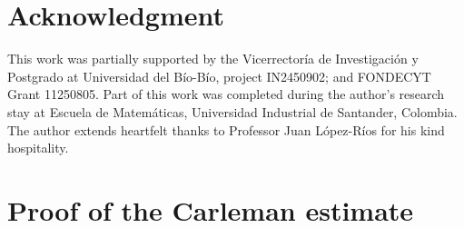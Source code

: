 \documentclass[11pt,oneside,leqno]{amsart}
\numberwithin{equation}{section}
\numberwithin{equation}{section}
\begin{document}
\section*{Acknowledgment}
This work was partially supported by the Vicerrector\'ia de Investigaci\'on y Postgrado at Universidad del B\'io-B\'io, project IN2450902; and FONDECYT Grant 11250805. Part of this work was completed during the author's research stay at Escuela de Matem\'aticas, Universidad Industrial de Santander, Colombia. The author extends heartfelt thanks to Professor Juan L\'opez-R\'ios for his kind hospitality.


\section{Proof of the Carleman estimate}\label{sec:proof:carleman}
\end{document}
